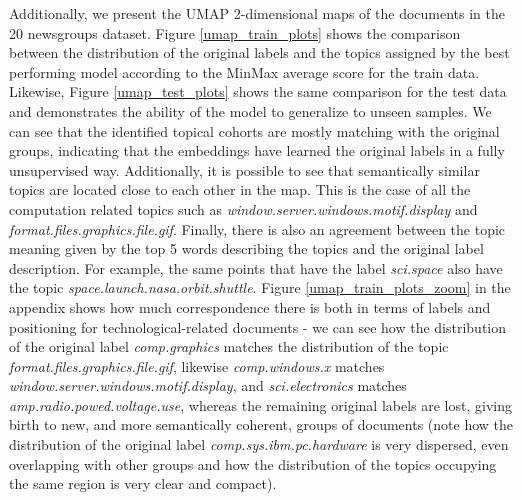 \documentclass[a4paper]{article}
\begin{document}
Additionally, we present the UMAP 2-dimensional maps of the documents in the 20 newsgroups dataset. Figure \ref{umap_train_plots} shows the comparison between the distribution of the original labels and the topics assigned by the best performing model according to the MinMax average score for the train data. Likewise, Figure \ref{umap_test_plots} shows the same comparison for the test data and demonstrates the ability of the model to generalize to unseen samples. We can see that the identified topical cohorts are mostly matching with the original groups, indicating that the embeddings have learned the original labels in a fully unsupervised way. Additionally, it is possible to see that semantically similar topics are located close to each other in the map. This is the case of all the computation related topics such as \emph{window.server.windows.motif.display} and \emph{format.files.graphics.file.gif}. Finally, there is also an agreement between the topic meaning given by the top 5 words describing the topics and the original label description. For example, the same points that have the label \emph{sci.space} also have the topic \emph{space.launch.nasa.orbit.shuttle}. Figure \ref{umap_train_plots_zoom} in the appendix shows how much correspondence there is both in terms of labels and positioning for technological-related documents - we can see how the distribution of the original label \emph{comp.graphics} matches the distribution of the topic \emph{format.files.graphics.file.gif}, likewise \emph{comp.windows.x} matches \emph{window.server.windows.motif.display}, and \emph{sci.electronics} matches \emph{amp.radio.powed.voltage.use}, whereas the remaining original labels are lost, giving birth to new, and more semantically coherent, groups of documents (note how the distribution of the original label \emph{comp.sys.ibm.pc.hardware} is very dispersed, even overlapping with other groups and how the distribution of the topics occupying the same region is very clear and compact).
\end{document}
